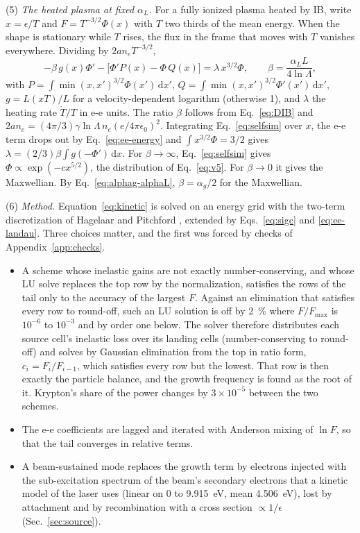 \documentclass[11pt]{article}
\numberwithin{equation}{section}
\newcommand{\dd}{\mathrm d}
\newcommand{\lnL}{\ln\Lambda}
\begin{document}
{\noindent}(5) \emph{The heated plasma at fixed $\alpha_L$.} For a fully ionized
plasma heated by IB, write $x=\epsilon/T$ and $F=T^{-3/2}\Phi(x)$ with $T$ two
thirds of the mean energy. When the shape is stationary while $T$ rises, the flux
in the frame that moves with $T$ vanishes everywhere. Dividing by $2an_eT^{-3/2}$,
\begin{equation}
-\beta\,g(x)\Phi'-\big[\Phi'P(x)-\Phi\,Q(x)\big]=\lambda\,x^{3/2}\Phi,\qquad
\beta=\frac{\alpha_LL}{4\lnL},
\label{eq:selfsim}
\end{equation}
with $P=\int\min(x,x')^{3/2}\Phi(x')\,\dd x'$, $Q=\int\min(x,x')^{3/2}\Phi'(x')\,\dd x'$,
$g=L(xT)/L$ for a velocity-dependent logarithm (otherwise 1), and $\lambda$ the
heating rate $\dot T/T$ in e-e units. The ratio $\beta$ follows from
Eq.~\eqref{eq:DIB} and $2an_e=(4\pi/3)\gamma\lnL\,n_e(e/4\pi\epsilon_0)^2$.
Integrating Eq.~\eqref{eq:selfsim} over $x$, the e-e term drops out by
Eq.~\eqref{eq:ee-energy} and $\int x^{3/2}\Phi=3/2$ gives
$\lambda=(2/3)\beta\int g(-\Phi')\,\dd x$. For $\beta\to\infty$,
Eq.~\eqref{eq:selfsim} gives $\Phi\propto\exp(-cx^{5/2})$, the distribution of
Eq.~\eqref{eq:v5}. For $\beta\to0$ it gives the Maxwellian. By
Eq.~\eqref{eq:alphag-alphaL}, $\beta=\alpha_g/2$ for the Maxwellian.

{\noindent}(6) \emph{Method.} \label{sec:method}
Equation~\eqref{eq:kinetic} is solved on an energy grid with the two-term
discretization of Hagelaar and Pitchford \cite{HP2005}, extended by
Eqs.~\eqref{eq:sigc} and \eqref{eq:ee-landau}. Three choices matter, and the first
was forced by checks of Appendix~\ref{app:checks}.
\begin{itemize}
\item A scheme whose inelastic gains are not exactly number-conserving, and whose
  LU solve replaces the top row by the normalization, satisfies the rows of the tail
  only to the accuracy of the largest $F$. Against an elimination that satisfies
  every row to round-off, such an LU solution
  is off by 2~\% where $F/F_{\max}$ is $10^{-6}$ to $10^{-3}$ and by order one below.
  The solver therefore distributes each source cell's inelastic loss over its
  landing cells (number-conserving to round-off) and solves by Gaussian
  elimination from the top in ratio form, $c_i=F_i/F_{i-1}$, which satisfies
  every row but the lowest. That row is then exactly the particle balance, and
  the growth frequency is found as the root of it. Krypton's share of the power
  changes by $3\times10^{-5}$ between the two schemes.
\item The e-e coefficients are lagged and iterated with Anderson mixing
  \cite{WalkerNi2011} of $\ln F$, so that the tail converges in relative terms.
\item A beam-sustained mode replaces the growth term by electrons injected with
  the sub-excitation spectrum of the beam's secondary electrons that a kinetic
  model of the laser uses (linear on
  $0$ to 9.915~eV, mean 4.506~eV), lost by attachment and by recombination with a cross
  section $\propto1/\epsilon$ (Sec.~\ref{sec:source}).
\end{itemize}
\end{document}
